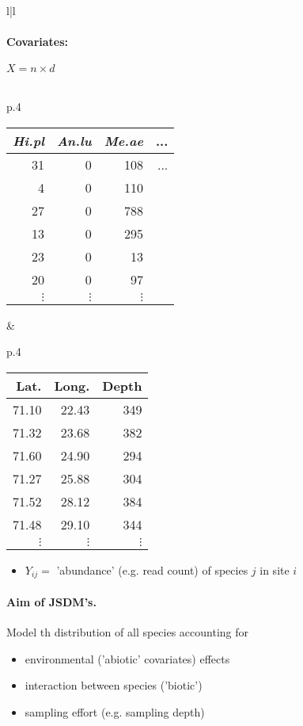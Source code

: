 \documentclass[8pt]{beamer}
\begin{document}
{\begin{tabular}{l|l}
    \paragraph{Covariates:} $X = n \times d$
    \\ \\
    \hspace{-.02\textwidth} 
    \begin{tabular}{p{}}
      \begin{tabular}{rrrr}
        {\sl Hi.pl} & {\sl An.lu} & {\sl Me.ae} & ... \\
        \hline
        31  &   0  & 108 & ... \\
        4  &   0  & 110 & \\
        27  &   0  & 788 & \\
        13  &   0  & 295 & \\
        23  &   0  &  13 & \\
        20  &   0  &  97 & \\
        $\vdots$ & $\vdots$ & $\vdots$
      \end{tabular} 
    \end{tabular}
    & 
    \begin{tabular}{p{}}
      \begin{tabular}{rrr}
        Lat. & Long. & Depth \\ \hline
        71.10 & 22.43 & 349 \\
        71.32 & 23.68 & 382 \\
        71.60 & 24.90 & 294 \\
        71.27 & 25.88 & 304 \\
        71.52 & 28.12 & 384 \\
        71.48 & 29.10 & 344 \\
        $\vdots$ & $\vdots$ & $\vdots$ 
      \end{tabular}
    \end{tabular}
  \end{tabular}
  \begin{itemize}
  \item $Y_{ij}=$ 'abundance' (e.g. read count) of species $j$ in site $i$
  \end{itemize}

  \bigskip
  \paragraph{Aim of JSDM's.} Model th  distribution of all species accounting for
  \begin{itemize}
   \item environmental ('abiotic' covariates) effects
   \item interaction between species ('biotic')
   \item sampling effort (e.g. sampling depth)
  \end{itemize}

}
\end{document}
